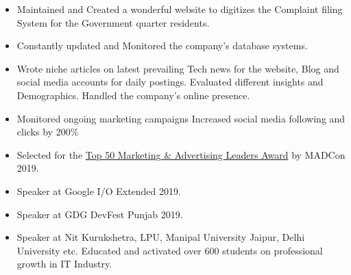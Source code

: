\documentclass[10pt,a4paper,ragged2e]{altacv}
\begin{document}
\begin{itemize}
\item Maintained and Created a wonderful website to digitizes the Complaint filing System for the Government quarter residents. 
\item Constantly updated and Monitored the company’s database systems.

\end{itemize}



\begin{itemize}
\item Wrote niche articles on latest prevailing Tech news for the website, Blog and social media accounts for daily postings.
Evaluated different insights and Demographics. Handled the company’s online presence.
 \item Monitored ongoing marketing campaigns
Increased social media following and clicks by 200\%

\end{itemize}




\begin{itemize}
     \item  \color{LightGrey} Selected for the \color{blue}\href{https://drive.google.com/drive/folders/1W8HZmATotqPVJcRV8dol9LuKinMlSWxu?usp=sharing }{Top 50 Marketing \& Advertising Leaders Award} \color{LightGrey} by MADCon 2019.
    \item  \color{LightGrey} Speaker at \color{blue}G\color{red}o\color{yellow}o\color{blue}g\color{teal}l\color{red}e \color{LightGrey} I/O Extended 2019. 
    \item  \color{LightGrey} Speaker at \color{LightGrey} GDG DevFest Punjab 2019.
  \item Speaker at Nit Kurukshetra, LPU, Manipal University Jaipur, Delhi University etc. Educated and activated over 600 students on professional growth in IT Industry.  
    
    \end{itemize}
\end{document}
